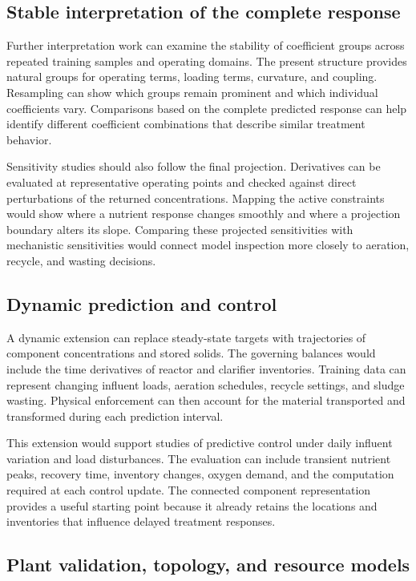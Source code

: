 \subsection{Stable interpretation of the complete response}

Further interpretation work can examine the stability of coefficient groups across repeated training samples and operating domains. The present structure provides natural groups for operating terms, loading terms, curvature, and coupling. Resampling can show which groups remain prominent and which individual coefficients vary. Comparisons based on the complete predicted response can help identify different coefficient combinations that describe similar treatment behavior.

Sensitivity studies should also follow the final projection. Derivatives can be evaluated at representative operating points and checked against direct perturbations of the returned concentrations. Mapping the active constraints would show where a nutrient response changes smoothly and where a projection boundary alters its slope. Comparing these projected sensitivities with mechanistic sensitivities would connect model inspection more closely to aeration, recycle, and wasting decisions.

\subsection{Dynamic prediction and control}

A dynamic extension can replace steady-state targets with trajectories of component concentrations and stored solids. The governing balances would include the time derivatives of reactor and clarifier inventories. Training data can represent changing influent loads, aeration schedules, recycle settings, and sludge wasting. Physical enforcement can then account for the material transported and transformed during each prediction interval.

This extension would support studies of predictive control under daily influent variation and load disturbances. The evaluation can include transient nutrient peaks, recovery time, inventory changes, oxygen demand, and the computation required at each control update. The connected component representation provides a useful starting point because it already retains the locations and inventories that influence delayed treatment responses.

\subsection{Plant validation, topology, and resource models}

